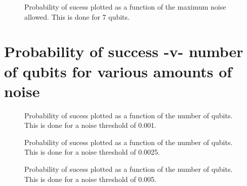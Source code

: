 \pagebreak

\begin{figure}[h]
\begin{center}
\end{center}
\caption{Probability of sucess plotted as a function of the maximum noise allowed.
This is done for 7 qubits.}
\end{figure}

\pagebreak

\vfill
\section{Probability of success -v- number of qubits for various amounts of noise}
\vfill

\pagebreak


\begin{figure}[h]
\begin{center}
\end{center}
\caption{Probability of sucess plotted as a function of the number of qubits. This
is done for a noise threshold of 0.001.}
\end{figure}

\pagebreak

\begin{figure}[h]
\begin{center}
\end{center}
\caption{Probability of sucess plotted as a function of the number of qubits. This
is done for a noise threshold of 0.0025.}
\end{figure}

\pagebreak

\begin{figure}[h]
\begin{center}
\end{center}
\caption{Probability of sucess plotted as a function of the number of qubits. This
is done for a noise threshold of 0.005.}
\end{figure}

